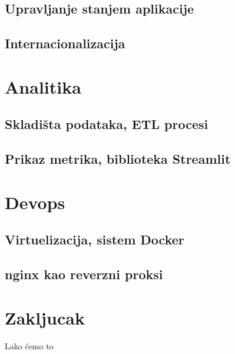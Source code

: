 \documentclass[12pt,oneside]{memoir}
\begin{document}
\section{Upravljanje stanjem aplikacije}
\section{Internacionalizacija}


\chapter{Analitika}
\section{Skladišta podataka, ETL procesi}
\section{Prikaz metrika, biblioteka Streamlit}

\chapter{Devops}
\section{Virtuelizacija, sistem Docker}
\section{nginx kao reverzni proksi}

\chapter{Zakljucak}
\literatura

\backmatter

\begin{biografija}
Lako ćemo to
\end{biografija}
\end{document}

